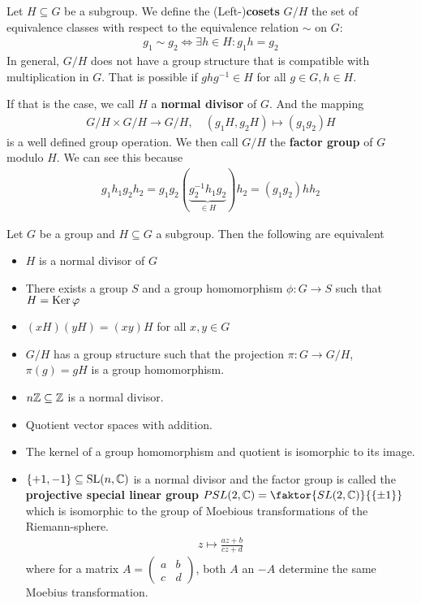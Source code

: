 \begin{dfn}[]
  Let $H \subseteq G$ be a subgroup. We define the (Left-)\textbf{cosets} $G/H$ the set of equivalence classes with respect to the equivalence relation $\sim$ on $G$:
  \begin{align*}
    g_1 \sim g_2 \iff \exists h \in H: g_1h = g_2
  \end{align*}
  In general, $G/H$ does not have a group structure that is compatible with multiplication in $G$.
  That is possible if $ghg^{-1} \in H$ for all $g \in G, h \in H$.

  If that is the case, we call $H$ a \textbf{normal divisor} of $G$. And the mapping 
  \begin{align*}
    G/H \times G/H \to  G/H, \quad (g_1H,g_2H) \mapsto (g_1g_2)H
  \end{align*}
  is a well defined group operation. We then call $G/H$ the \textbf{factor group} of $G$ modulo $H$.
  We can see this because
  \begin{align*}
    g_1h_1g_2h_2 = g_1g_2(\underbrace{g_2^{-1}h_1g_2}_{\in H})h_2 = (g_1g_2)hh_2
  \end{align*}
\end{dfn}
\begin{thm}[]
Let $G$ be a group and $H \subseteq G$ a subgroup. Then the following are equivalent
\begin{itemize}
  \item $H$ is a normal divisor of $G$
  \item There exists a group $S$ and a group homomorphism $\phi: G \to S$ such that $H = \operatorname{Ker} \varphi$
  \item $(xH)(yH) = (xy)H$ for all $x,y \in G$
  \item $G/H$ has a group structure such that the projection $\pi: G \to  G/H$, $\pi(g) = gH$ is a group homomorphism.
\end{itemize}
\end{thm}
\begin{ex}[]
\begin{itemize}
  \item $n\mathbb{Z} \subseteq \mathbb{Z}$ is a normal divisor.
  \item Quotient vector spaces with addition.
  \item The kernel of a group homomorphism and quotient is isomorphic to its image.
  \item $\{+1,-1\} \subseteq \operatorname{SL}(n,\mathbb{C})$ is a normal divisor and the factor group is called the \textbf{projective special linear group} $PSL(2,\C) = \faktor{SL(2,\C)}{\{\pm 1\}}$ which is isomorphic to the group of Moebious transformations of the Riemann-sphere.
    \begin{align*}
      z \mapsto \frac{az + b}{cz + d}
    \end{align*}
    where for a matrix $A = \begin{pmatrix}
    a & b\\
    c & d
    \end{pmatrix}
    $, both $A$ an $-A$ determine the same Moebius transformation.
\end{itemize}
\end{ex}

